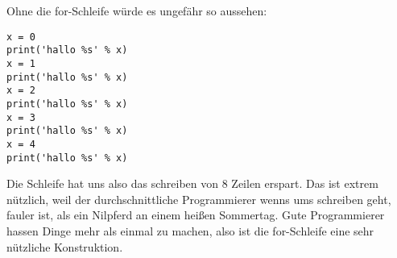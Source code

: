 Ohne die for-Schleife würde es ungefähr so aussehen:

\begin{Verbatim}[frame=single]
x = 0
print('hallo %s' % x)
x = 1
print('hallo %s' % x)
x = 2
print('hallo %s' % x)
x = 3
print('hallo %s' % x)
x = 4
print('hallo %s' % x)
\end{Verbatim}

Die Schleife hat uns also das schreiben von 8 Zeilen erspart. Das ist extrem nützlich, weil der durchschnittliche Programmierer wenns ums schreiben geht, fauler ist, als ein Nilpferd an einem heißen Sommertag. Gute Programmierer hassen Dinge mehr als einmal zu machen, also ist die for-Schleife eine sehr nützliche Konstruktion.

